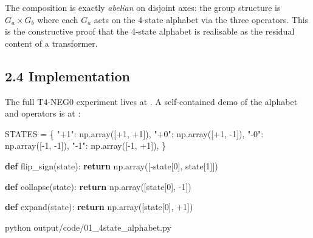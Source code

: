 \documentclass[
  twocolumn,
  10pt,
  a4paper]{article}
\newenvironment{Shaded}{}{}
\newcommand{\ControlFlowTok}[1]{\textcolor[rgb]{0.00,0.44,0.13}{\textbf{#1}}}
\newcommand{\DecValTok}[1]{\textcolor[rgb]{0.25,0.63,0.44}{#1}}
\newcommand{\ExtensionTok}[1]{#1}
\newcommand{\KeywordTok}[1]{\textcolor[rgb]{0.00,0.44,0.13}{\textbf{#1}}}
\newcommand{\NormalTok}[1]{#1}
\newcommand{\OperatorTok}[1]{\textcolor[rgb]{0.40,0.40,0.40}{#1}}
\newcommand{\StringTok}[1]{\textcolor[rgb]{0.25,0.44,0.63}{#1}}
\begin{document}
The composition is exactly \emph{abelian} on disjoint axes: the group
structure is \(G_a \times G_b\) where each \(G_a\) acts on the 4-state
alphabet via the three operators. This is the constructive proof that
the 4-state alphabet is realisable as the residual content of a
transformer.

\hypertarget{implementation}{%
\subsection{2.4 Implementation}\label{implementation}}

The full T4-NEG0 experiment lives at
\texttt{}. A
self-contained demo of the alphabet and operators is at
\texttt{}:

\begin{Shaded}
\begin{Highlighting}[]
\NormalTok{STATES }\OperatorTok{=}\NormalTok{ \{}
    \StringTok{"+1"}\NormalTok{: np.array([}\OperatorTok{+}\DecValTok{1}\NormalTok{, }\OperatorTok{+}\DecValTok{1}\NormalTok{]),}
    \StringTok{"+0"}\NormalTok{: np.array([}\OperatorTok{+}\DecValTok{1}\NormalTok{, }\OperatorTok{{-}}\DecValTok{1}\NormalTok{]),}
    \StringTok{"{-}0"}\NormalTok{: np.array([}\OperatorTok{{-}}\DecValTok{1}\NormalTok{, }\OperatorTok{{-}}\DecValTok{1}\NormalTok{]),}
    \StringTok{"{-}1"}\NormalTok{: np.array([}\OperatorTok{{-}}\DecValTok{1}\NormalTok{, }\OperatorTok{+}\DecValTok{1}\NormalTok{]),}
\NormalTok{\}}

\KeywordTok{def}\NormalTok{ flip\_sign(state):}
    \ControlFlowTok{return}\NormalTok{ np.array([}\OperatorTok{{-}}\NormalTok{state[}\DecValTok{0}\NormalTok{], state[}\DecValTok{1}\NormalTok{]])}

\KeywordTok{def}\NormalTok{ collapse(state):}
    \ControlFlowTok{return}\NormalTok{ np.array([state[}\DecValTok{0}\NormalTok{], }\OperatorTok{{-}}\DecValTok{1}\NormalTok{])}

\KeywordTok{def}\NormalTok{ expand(state):}
    \ControlFlowTok{return}\NormalTok{ np.array([state[}\DecValTok{0}\NormalTok{], }\OperatorTok{+}\DecValTok{1}\NormalTok{])}
\end{Highlighting}
\end{Shaded}

\begin{Shaded}
\begin{Highlighting}[]
\ExtensionTok{python}\NormalTok{ output/code/01\_4state\_alphabet.py}
\end{Highlighting}
\end{Shaded}
\end{document}
